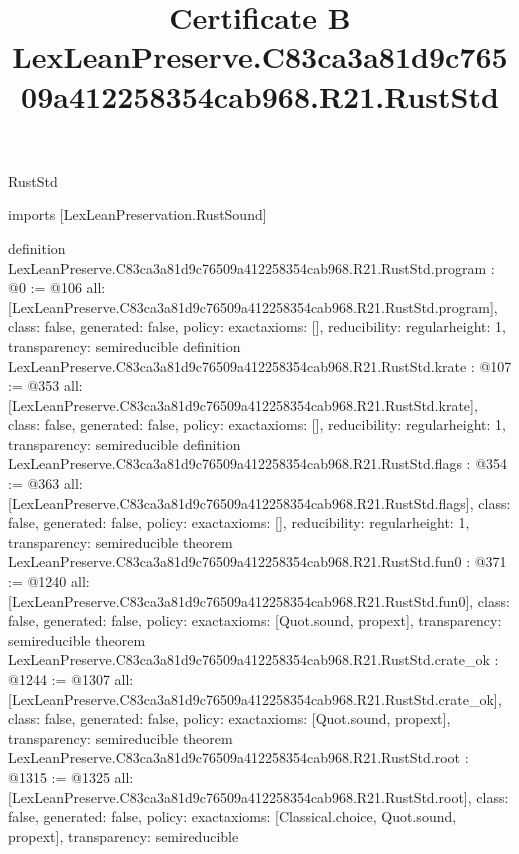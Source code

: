 \begin{lexlean}{RustStd}
\title{Certificate B LexLeanPreserve.C83ca3a81d9c76509a412258354cab968.R21.RustStd}
\begin{coremodule}
imports [LexLeanPreservation.RustSound]

definition LexLeanPreserve.C83ca3a81d9c76509a412258354cab968.R21.RustStd.program : @0 := @106 {
  all: [LexLeanPreserve.C83ca3a81d9c76509a412258354cab968.R21.RustStd.program],
  class: false,
  generated: false,
  policy: exact{axioms: []},
  reducibility: regular{height: 1},
  transparency: semireducible
}
definition LexLeanPreserve.C83ca3a81d9c76509a412258354cab968.R21.RustStd.krate : @107 := @353 {
  all: [LexLeanPreserve.C83ca3a81d9c76509a412258354cab968.R21.RustStd.krate],
  class: false,
  generated: false,
  policy: exact{axioms: []},
  reducibility: regular{height: 1},
  transparency: semireducible
}
definition LexLeanPreserve.C83ca3a81d9c76509a412258354cab968.R21.RustStd.flags : @354 := @363 {
  all: [LexLeanPreserve.C83ca3a81d9c76509a412258354cab968.R21.RustStd.flags],
  class: false,
  generated: false,
  policy: exact{axioms: []},
  reducibility: regular{height: 1},
  transparency: semireducible
}
theorem LexLeanPreserve.C83ca3a81d9c76509a412258354cab968.R21.RustStd.fun0 : @371 := @1240 {
  all: [LexLeanPreserve.C83ca3a81d9c76509a412258354cab968.R21.RustStd.fun0],
  class: false,
  generated: false,
  policy: exact{axioms: [Quot.sound, propext]},
  transparency: semireducible
}
theorem LexLeanPreserve.C83ca3a81d9c76509a412258354cab968.R21.RustStd.crate_ok : @1244 := @1307 {
  all: [LexLeanPreserve.C83ca3a81d9c76509a412258354cab968.R21.RustStd.crate_ok],
  class: false,
  generated: false,
  policy: exact{axioms: [Quot.sound, propext]},
  transparency: semireducible
}
theorem LexLeanPreserve.C83ca3a81d9c76509a412258354cab968.R21.RustStd.root : @1315 := @1325 {
  all: [LexLeanPreserve.C83ca3a81d9c76509a412258354cab968.R21.RustStd.root],
  class: false,
  generated: false,
  policy: exact{axioms: [Classical.choice, Quot.sound, propext]},
  transparency: semireducible
}


\end{coremodule}
\end{lexlean}
